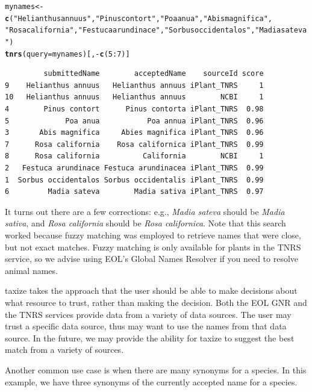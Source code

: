 \documentclass[10pt]{article}\usepackage[]{graphicx}\usepackage[]{color}
\makeatletter
\newcommand{\hlfunctioncall}[1]{\textcolor[rgb]{0.501960784313725,0,0.329411764705882}{\textbf{#1}}}%
\newcommand{\hlstring}[1]{\textcolor[rgb]{0.6,0.6,1}{#1}}%
\newenvironment{kframe}{%
 \def\at@end@of@kframe{}%
 \ifinner\ifhmode%
  \def\at@end@of@kframe{\end{minipage}}%
  \begin{minipage}{\columnwidth}%
 \fi\fi%
 \def\FrameCommand##1{\hskip\@totalleftmargin \hskip-\fboxsep
 \colorbox{shadecolor}{##1}\hskip-\fboxsep
     \hskip-\linewidth \hskip-\@totalleftmargin \hskip\columnwidth}%
 \MakeFramed {\advance\hsize-\width
   \@totalleftmargin\z@ \linewidth\hsize
   \@setminipage}}%
 {\par\unskip\endMakeFramed%
 \at@end@of@kframe}
\newenvironment{knitrout}{}{} %
\makeatother
\begin{document}
\begin{knitrout}
\color{fgcolor}\begin{kframe}
\begin{alltt}
mynames <- \hlfunctioncall{c}(\hlstring{"Helianthus annuus"}, \hlstring{"Pinus contort"}, \hlstring{"Poa anua"}, \hlstring{"Abis magnifica"}, 
    \hlstring{"Rosa california"}, \hlstring{"Festuca arundinace"}, \hlstring{"Sorbus occidentalos"}, \hlstring{"Madia sateva"})
\hlfunctioncall{tnrs}(query = mynames)[, -\hlfunctioncall{c}(5:7)]
\end{alltt}
\begin{verbatim}
         submittedName        acceptedName    sourceId score
9    Helianthus annuus   Helianthus annuus iPlant_TNRS     1
10   Helianthus annuus   Helianthus annuus        NCBI     1
4        Pinus contort      Pinus contorta iPlant_TNRS  0.98
5             Poa anua           Poa annua iPlant_TNRS  0.96
3       Abis magnifica     Abies magnifica iPlant_TNRS  0.96
7      Rosa california    Rosa californica iPlant_TNRS  0.99
8      Rosa california          California        NCBI     1
2   Festuca arundinace Festuca arundinacea iPlant_TNRS  0.99
1  Sorbus occidentalos Sorbus occidentalis iPlant_TNRS  0.99
6         Madia sateva        Madia sativa iPlant_TNRS  0.97
\end{verbatim}
\end{kframe}
\end{knitrout}


It turns out there are a few corrections: e.g., \emph{Madia sateva} should be \emph{Madia sativa}, and \emph{Rosa california} should be \emph{Rosa californica}. Note that this search worked because fuzzy matching was employed to retrieve names that were close, but not exact matches. Fuzzy matching is only available for plants in the TNRS service, so we advise using EOL's Global Names Resolver if you need to resolve animal names.

taxize takes the approach that the user should be able to make decisions about what resource to trust, rather than making the decision. Both the EOL GNR and the TNRS services provide data from a variety of data sources. The user may trust a specific data source, thus may want to use the names from that data source. In the future, we may provide the ability for taxize to suggest the best match from a variety of sources.

Another common use case is when there are many synonyms for a species. In this example, we have three synonyms of the currently accepted name for a species. 
\end{document}
